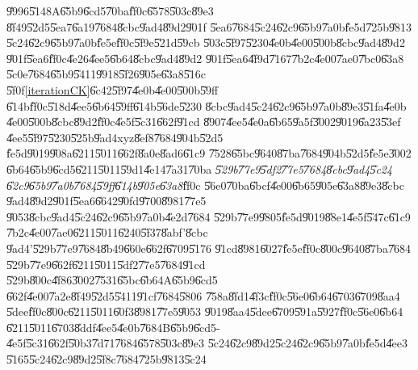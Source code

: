 \U{9996}\U{5148}A\U{65b9}\U{6cd5}\U{70ba}\U{ff0c}\U{6578}\U{503c}\U{89e3}%
\U{8f49}\U{52d5}\U{5ea7}\U{6a19}\U{7684}\U{8cbc}\U{9ad4}\U{89d2}\U{901f}%
\U{5ea6}\U{7684}\U{5c24}\U{62c9}\U{65b9}\U{7a0b}\U{fe5d}\U{725b}\U{9813}%
\U{5c24}\U{62c9}\U{65b9}\U{7a0b}\U{fe5e}\U{ff0c}\U{5f9e}\U{521d}\U{59cb}%
\U{503c}\U{5f97}\U{5230}\U{4e0b}\U{4e00}\U{500b}\U{8cbc}\U{9ad4}\U{89d2}%
\U{901f}\U{5ea6}\U{ff0c}\U{4e26}\U{4ee5}\U{6b64}\U{8cbc}\U{9ad4}\U{89d2}%
\U{901f}\U{5ea6}\U{4f9d}\U{7167}\U{7b2c}\U{4e00}\U{7ae0}\U{7bc0}\U{63a8}%
\U{5c0e}\U{7684}\U{65b9}\U{5411}\U{9918}\U{5f26}\U{905e}\U{63a8}\U{516c}%
\U{5f0f}\ref{iterationCK}\U{6c42}\U{5f97}\U{4e0b}\U{4e00}\U{500b}\U{59ff}%
\U{614b}\U{ff0c}\U{518d}\U{4ee5}\U{6b64}\U{59ff}\U{614b}\U{56de}\U{5230}%
\U{8cbc}\U{9ad4}\U{5c24}\U{62c9}\U{65b9}\U{7a0b}\U{89e3}\U{51fa}\U{4e0b}%
\U{4e00}\U{500b}\U{8cbc}\U{89d2}\U{ff0c}\U{4e5f}\U{5c31}\U{662f}\U{91cd}%
\U{8907}\U{4ee5}\U{4e0a}\U{6b65}\U{9a5f}\U{3002}\U{9019}\U{6a23}\U{53ef}%
\U{4ee5}\U{5f97}\U{5230}\U{525b}\U{9ad4}xyz\U{8ef8}\U{7684}\U{904b}\U{52d5}%
\U{fe5d}\U{9019}\U{908a}\U{6211}\U{5011}\U{662f}\U{8a0e}\U{8ad6}\U{61c9}%
\U{7528}\U{65bc}\U{9640}\U{87ba}\U{7684}\U{904b}\U{52d5}\U{fe5e}\U{3002}%
\U{6b64}\U{65b9}\U{6cd5}\U{6211}\U{5011}\U{59d1}\U{4e14}\U{7a31}\U{70ba}%
\emph{\U{529b}\U{77e9}\U{5df2}\U{77e5}\U{7684}\U{8cbc}\U{9ad4}\U{5c24}%
\U{62c9}\U{65b9}\U{7a0b}\U{7684}\U{59ff}\U{614b}\U{905e}\U{63a8}}\U{ff0c}%
\U{56e0}\U{70ba}\U{6bcf}\U{4e00}\U{6b65}\U{905e}\U{63a8}\U{89e3}\U{8cbc}%
\U{9ad4}\U{89d2}\U{901f}\U{5ea6}\U{6642}\U{90fd}\U{9700}\U{8981}\U{77e5}%
\U{9053}\U{8cbc}\U{9ad4}\U{5c24}\U{62c9}\U{65b9}\U{7a0b}\U{4e2d}\U{7684}%
\U{529b}\U{77e9}\U{9805}\U{fe5d}\U{9019}\U{88e1}\U{4e5f}\U{547c}\U{61c9}%
\U{7b2c}\U{4e00}\U{7ae0}\U{6211}\U{5011}\U{6240}\U{5f37}\U{8abf}'\U{8cbc}%
\U{9ad4}'\U{529b}\U{77e9}\U{7684}\U{8b49}\U{660e}\U{662f}\U{6709}\U{5176}%
\U{91cd}\U{8981}\U{6027}\U{fe5e}\U{ff0c}\U{800c}\U{9640}\U{87ba}\U{7684}%
\U{529b}\U{77e9}\U{662f}\U{6211}\U{5011}\U{5df2}\U{77e5}\U{7684}\U{91cd}%
\U{529b}\U{800c}\U{4f86}\U{3002}\U{7531}\U{65bc}\U{6b64}A\U{65b9}\U{6cd5}%
\U{662f}\U{4e00}\U{7a2e}\U{8f49}\U{52d5}\U{5411}\U{91cf}\U{7684}\U{5806}%
\U{758a}\U{8fd1}\U{4f3c}\U{ff0c}\U{56e0}\U{6b64}\U{6703}\U{6709}\U{8aa4}%
\U{5dee}\U{ff0c}\U{800c}\U{6211}\U{5011}\U{60f3}\U{8981}\U{77e5}\U{9053}%
\U{9019}\U{8aa4}\U{5dee}\U{6709}\U{591a}\U{5927}\U{ff0c}\U{56e0}\U{6b64}%
\U{6211}\U{5011}\U{6703}\U{8ddf}\U{4ee5}\U{4e0b}\U{7684}B\U{65b9}\U{6cd5}-%
\U{4e5f}\U{5c31}\U{662f}\U{50b3}\U{7d71}\U{7684}\U{6578}\U{503c}\U{89e3}%
\U{5c24}\U{62c9}\U{89d2}\U{5c24}\U{62c9}\U{65b9}\U{7a0b}\U{fe5d}\U{4ee3}%
\U{5165}\U{5c24}\U{62c9}\U{89d2}\U{5f8c}\U{7684}\U{725b}\U{9813}\U{5c24}%
